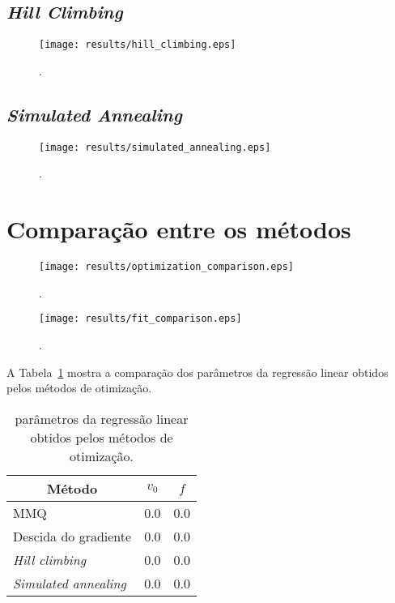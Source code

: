 \documentclass[brazil, 12pt]{article}
\begin{document}
\subsection{\emph{Hill Climbing}}
\begin{figure}[H]
	\centering
	\texttt{[image: results/hill\_climbing.eps]} %
	\caption{.} %
	\label{fig:hill_climbing}  %
\end{figure}

\subsection{\emph{Simulated Annealing}}
\begin{figure}[H]
	\centering
	\texttt{[image: results/simulated\_annealing.eps]} %
	\caption{.} %
	\label{fig:simulated_annealing}  %
\end{figure}


\section{Comparação entre os métodos}

\begin{figure}[H]
	\centering
	\texttt{[image: results/optimization\_comparison.eps]} %
	\caption{.} %
	\label{fig:optimization_comparison}  %
\end{figure}

\begin{figure}[H]
	\centering
	\texttt{[image: results/fit\_comparison.eps]} %
	\caption{.} %
	\label{fig:fit_comparison}  %
\end{figure}

A Tabela~\ref{tab:comp} mostra a comparação dos parâmetros da regressão linear obtidos pelos métodos de otimização.

\begin{table}[H]
\centering
\caption{parâmetros da regressão linear obtidos pelos métodos de otimização.}
\label{tab:comp}
\begin{tabular}{|l|l|l|}
\hline
\multicolumn{1}{|c|}{\textbf{Método}}       & \multicolumn{1}{c|}{\textbf{$v_0$}} & \multicolumn{1}{c|}{\textbf{$f$}} \\ \hline
MMQ                         & 0.0       & 0.0       \\ \hline
Descida do gradiente        & 0.0       & 0.0       \\ \hline
\emph{Hill climbing}        & 0.0       & 0.0       \\ \hline
\emph{Simulated annealing}  & 0.0       & 0.0       \\ \hline
\end{tabular}
\end{table}
\end{document}
